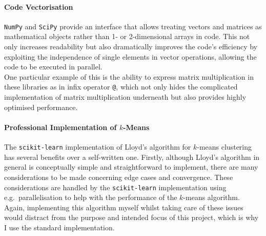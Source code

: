 %

\paragraph{Code Vectorisation}
\texttt{NumPy} and \texttt{SciPy} provide an interface that allows treating vectors and matrices 
as mathematical objects rather than 1- or 2-dimensional arrays in code. This not only increases 
readability  but also dramatically improves the code's efficiency by exploiting the 
independence of single elements in vector operations, allowing the code to be executed in parallel.
\\
One particular example of this is the ability to express matrix multiplication in these libraries 
as in infix operator \texttt{@}, which not only hides the complicated implementation of matrix 
multiplication underneath but also provides highly optimised performance.

\paragraph{Professional Implementation of $k$-Means}
The \texttt{scikit-learn} implementation of Lloyd's algorithm for $k$-means clustering has several
benefits over a self-written one. Firstly, although Lloyd's algorithm in general is conceptually 
simple and straightforward to implement, there are many considerations to be made concerning edge
cases and convergence. These considerations are handled by the 
\texttt{scikit-learn} implementation using e.g.\ parallelisation to help with the performance of 
the $k$-means algorithm. Again, implementing this algorithm myself whilst taking care of these 
issues would distract from the purpose and intended focus of this project, which is why I use the
standard implementation.

